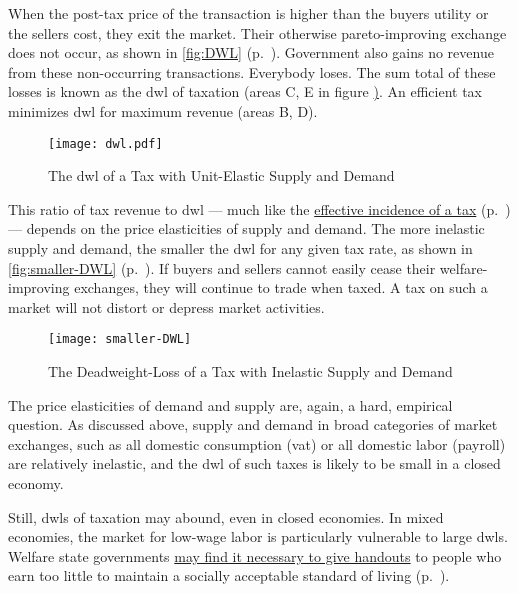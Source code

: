 When the post-tax price of the transaction is higher than the buyers utility or the sellers cost, they exit the market.
Their otherwise pareto-improving exchange does not occur, as shown in \autoref{fig:DWL} (p.~\pageref{fig:DWL}).
Government also gains no revenue from these non-occurring transactions.
Everybody loses.
The sum total of these losses is known as the \gls{dwl} of taxation (areas C, E in figure \href{fig:DWL}).
An efficient tax minimizes \gls{dwl} for maximum revenue (areas B, D).

\begin{figure}[htbp]
	\centering
	\texttt{[image: dwl.pdf]}
	\caption[Deadweight-Loss of a Tax with Unit-Elastic Supply and Demand]{The \gls{dwl} of a Tax with Unit-Elastic Supply and Demand}
	\label{fig:DWL}
\end{figure}

This ratio of tax revenue to \gls{dwl} --- much like the \hyperref[sec:well-determined-incidence]{effective incidence of a tax} (p.~\pageref{sec:well-determined-incidence}) --- depends on the price elasticities of supply and demand.
The more inelastic supply and demand, the smaller the \gls{dwl} for any given tax rate, as shown in \autoref{fig:smaller-DWL} (p.~\pageref{fig:smaller-DWL}).
If buyers and sellers cannot easily cease their welfare-improving exchanges, they will continue to trade when taxed.
A tax on such a market will not distort or depress market activities.

\begin{figure}[htbp]
	\centering
	\texttt{[image: smaller-DWL]}
	\caption[Deadweight-Loss of a Tax with Inelastic Suppy and Demand]{The Deadweight-Loss of a Tax with Inelastic Supply and Demand}
	\label{fig:smaller-DWL}
\end{figure}

The price elasticities of demand and supply are, again, a hard, empirical question.
As discussed above, supply and demand in broad categories of market exchanges, such as all domestic consumption (\gls{vat}) or all domestic labor (\gls{payroll}) are relatively inelastic, and the \gls{dwl} of such taxes is likely to be small in a closed economy.

Still, \glspl{dwl} of taxation may abound, even in closed economies.
In mixed economies, the market for low-wage labor is particularly vulnerable to large \gls{dwl}s.
Welfare state governments  \hyperref[sec:distribution]{may find it necessary to give handouts} to people who earn too little to maintain a socially acceptable standard of living (p.~\pageref{sec:distribution}).

